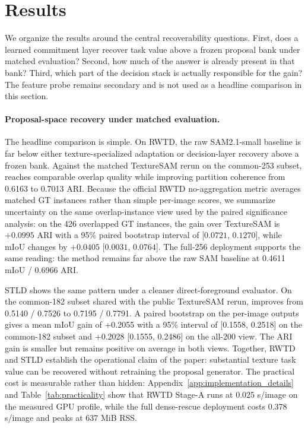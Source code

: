\section{Results}
\label{sec:results}

We organize the results around the central recoverability questions. First, does a learned commitment layer recover task value above a frozen proposal bank under matched evaluation? Second, how much of the answer is already present in that bank? Third, which part of the decision stack is actually responsible for the gain? The feature probe remains secondary and is not used as a headline comparison in this section.



\paragraph{Proposal-space recovery under matched evaluation.} The headline comparison is simple. On RWTD, the raw SAM2.1-small baseline is far below either texture-specialized adaptation or decision-layer recovery above a frozen bank. Against the matched TextureSAM rerun on the common-253 subset, \sys{} reaches comparable overlap quality while improving partition coherence from 0.6163 to 0.7013 ARI. Because the official RWTD no-aggregation metric averages matched GT instances rather than simple per-image scores, we summarize uncertainty on the same overlap-instance view used by the paired significance analysis: on the 426 overlapped GT instances, the gain over TextureSAM is $+0.0995$ ARI with a 95\% paired bootstrap interval of [$0.0721$, $0.1270$], while mIoU changes by $+0.0405$ [$0.0031$, $0.0764$]. The full-256 deployment supports the same reading: the method remains far above the raw SAM baseline at 0.4611 mIoU / 0.6966 ARI.

STLD shows the same pattern under a cleaner direct-foreground evaluator. On the common-182 subset shared with the public TextureSAM rerun, \sys{} improves from 0.5140 / 0.7526 to 0.7195 / 0.7791. A paired bootstrap on the per-image outputs gives a mean mIoU gain of +0.2055 with a 95\% interval of [0.1558, 0.2518] on the common-182 subset and +0.2028 [0.1555, 0.2486] on the all-200 view. The ARI gain is smaller but remains positive on average in both views. Together, RWTD and STLD establish the operational claim of the paper: substantial texture task value can be recovered without retraining the proposal generator. The practical cost is measurable rather than hidden: Appendix~\ref{app:implementation_details} and Table~\ref{tab:practicality} show that RWTD Stage-A runs at 0.025 s/image on the measured GPU profile, while the full dense-rescue deployment costs 0.378 s/image and peaks at 637 MiB RSS.

